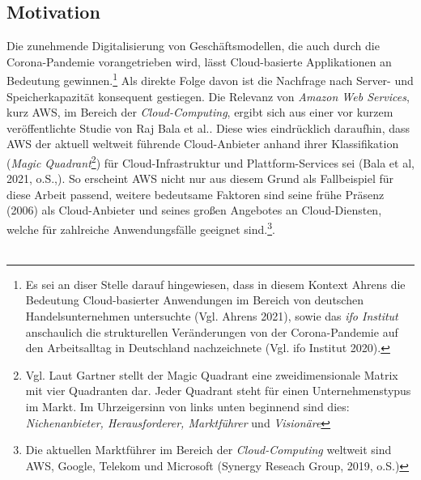 \subsection{Motivation}
Die zunehmende Digitalisierung von Geschäftsmodellen, die auch durch die Corona-Pandemie vorangetrieben wird, lässt Cloud-basierte Applikationen an Bedeutung gewinnen.\footnote{Es sei an diser Stelle darauf hingewiesen, dass in diesem Kontext Ahrens die Bedeutung Cloud-basierter Anwendungen im Bereich von deutschen Handelsunternehmen untersuchte (Vgl. Ahrens 2021)\cite{STA3}, sowie das \textit{ifo Institut} anschaulich die strukturellen Veränderungen von der Corona-Pandemie auf den Arbeitsalltag in Deutschland nachzeichnete (Vgl. ifo Institut 2020)\cite{STA2}.} Als direkte Folge davon ist die Nachfrage nach Server- und Speicherkapazität konsequent gestiegen.
Die Relevanz von \textit{Amazon Web Services}, kurz AWS, im Bereich der \textit{Cloud-Computing}, ergibt sich aus einer vor kurzem veröffentlichte Studie von Raj Bala et al.. Diese wies eindrücklich daraufhin, dass AWS der aktuell weltweit führende Cloud-Anbieter anhand ihrer Klassifikation (\textit{Magic Quadrant}\footnote{Vgl.  Laut Gartner stellt der Magic Quadrant eine zweidimensionale Matrix mit vier Quadranten dar. Jeder Quadrant steht für einen Unternehmenstypus im Markt. Im Uhrzeigersinn von links unten beginnend sind dies: \textit{Nichenanbieter, Herausforderer, Marktführer }und \textit{Visionäre}}) für Cloud-Infrastruktur und Plattform-Services sei (Bala et al, 2021, o.S.,\cite{G01}).
So erscheint AWS nicht nur aus diesem Grund als Fallbeispiel für diese Arbeit passend, weitere bedeutsame Faktoren sind seine frühe Präsenz (2006) als Cloud-Anbieter und seines großen Angebotes an Cloud-Diensten, welche für zahlreiche Anwendungsfälle geeignet sind.\footnote{Die aktuellen Marktführer im Bereich der \textit{Cloud-Computing} weltweit sind AWS, Google, Telekom und Microsoft (Synergy Reseach Group, 2019, o.S.\cite{STA6})}.
\\\\

